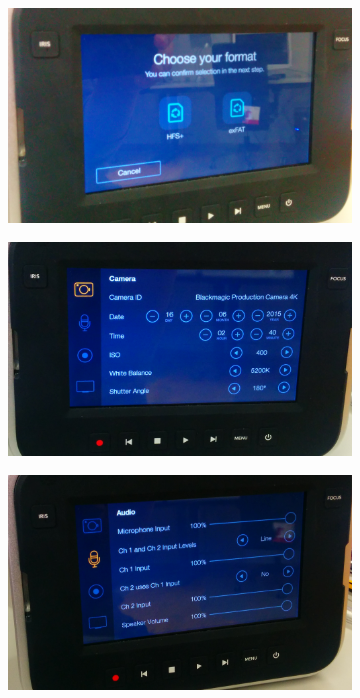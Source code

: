 \documentclass[[12pt,DIV14,BCOR12mm,a4paper,footexclude,headinclude,halfparskip-,twoside,openright,cleardoubleempty,idxtotoc,bibtotoc]{article}
\begin{document}
\begin{figure}[ht]
	\begin{subfigure}[b]{0.22\textwidth}
	      \includegraphics[width=\textwidth]{figures/camera1.png}
	      \caption{}
		\label{fig_cam_b}
	\end{subfigure}	        
	\begin{subfigure}[b]{0.22\textwidth}
	       \includegraphics[width=\textwidth]{figures/camera3.png}
	       \caption{}
	\label{fig_cam_c}
	\end{subfigure}
	\begin{subfigure}[b]{0.22\textwidth}
	      \includegraphics[width=\textwidth]{figures/camera4.png}

\end{subfigure}
\end{figure}
\end{document}
